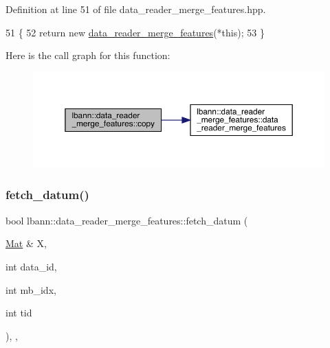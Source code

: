 Definition at line 51 of file data\+\_\+reader\+\_\+merge\+\_\+features.\+hpp.


\begin{DoxyCode}
51                                                     \{
52     \textcolor{keywordflow}{return} \textcolor{keyword}{new} \hyperlink{classlbann_1_1data__reader__merge__features_ac05d7a06c3a5749afc41c3b86bb2475d}{data\_reader\_merge\_features}(*\textcolor{keyword}{this});
53   \}
\end{DoxyCode}
Here is the call graph for this function\+:\nopagebreak
\begin{figure}[H]
\begin{center}
\leavevmode
\includegraphics[width=350pt]{classlbann_1_1data__reader__merge__features_aa079ec1e03557e2c469f9da6e8aa45a8_cgraph}
\end{center}
\end{figure}
\mbox{\label{classlbann_1_1data__reader__merge__features_a9796a63e099e93114dc72decd187b3b4}} 
\subsubsection{\texorpdfstring{fetch\+\_\+datum()}{fetch\_datum()}}
{\footnotesize\ttfamily bool lbann\+::data\+\_\+reader\+\_\+merge\+\_\+features\+::fetch\+\_\+datum (\begin{DoxyParamCaption}\item[{\hyperlink{base_8hpp_a68f11fdc31b62516cb310831bbe54d73}{Mat} \&}]{X,  }\item[{int}]{data\+\_\+id,  }\item[{int}]{mb\+\_\+idx,  }\item[{int}]{tid }\end{DoxyParamCaption})\hspace{0.3cm}{\ttfamily [override]}, {\ttfamily [protected]}, {\ttfamily [virtual]}}

